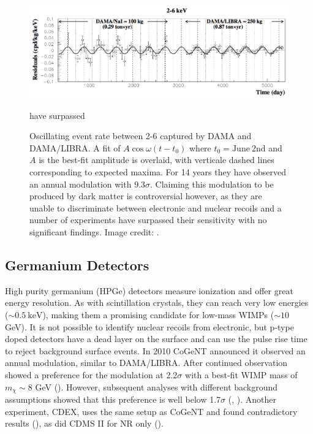 \begin{figure}
\centering
\includegraphics[width=\textwidth]{DAMAModulation}
\caption{Oscillating event rate between 2-6 \kevee captured by DAMA and DAMA/LIBRA.  A fit of $A \cos \omega (t - t_{0})$ where
$t_{0} = \mathrm{June\ 2nd}$ and $A$ is the best-fit amplitude is overlaid, with verticale dashed lines corresponding to expected
maxima.  For 14 years they have observed an annual
modulation with $9.3\sigma$.  Claiming this modulation to be produced by dark matter is controversial however, as they are unable to
discriminate between electronic and nuclear recoils and a number of experiments have surpassed their sensitivity with no significant
findings.  Image credit: .}
have surpassed 
\label{fig:dama}
\end{figure}

\subsection{Germanium Detectors}
\label{subsec:germanium}
High purity germanium (HPGe) detectors measure ionization and offer great energy resolution.  As with scintillation crystals,
they can reach very low energies ($\sim 0.5\ \mathrm{keV}$), making them a promising candidate for low-mass WIMPs ($\sim 10$ GeV).  It is not
possible to identify nuclear recoils from electronic, but p-type doped detectors have a dead layer on the surface and can use the
pulse rise time to reject background surface events.  In 2010 CoGeNT
announced it observed an annual modulation, similar to DAMA/LIBRA.  After continued observation showed a preference for the modulation
at 2.2$\sigma$ with a best-fit WIMP mass of $m_{\chi}\sim 8$ GeV ().  However, subsequent analyses with different
background assumptions showed that this preference is well below 1.7$\sigma$ (, ).  Another
experiment, CDEX, uses the same setup as CoGeNT and found contradictory results (), as did CDMS II for NR only
().


